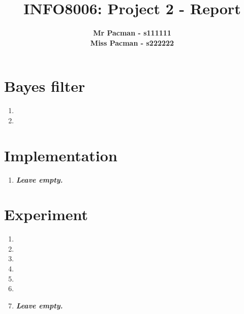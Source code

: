\documentclass{article}
\begin{document}

\title{\Large{INFO8006: Project 2 - Report}}
\vspace{1cm}
\author{\small{\bf Mr Pacman - s111111} \\ \small{\bf Miss Pacman - s222222}}

\maketitle


\section{Bayes filter}

\begin{enumerate}[label=\alph*.,leftmargin=*]
    \item
    \item
\end{enumerate}

\section{Implementation}

\begin{enumerate}[label=\alph*.,leftmargin=*]
    \item \textbf{\textit{Leave empty.}}
\end{enumerate}

\section{Experiment}

\begin{enumerate}[label=\alph*.,leftmargin=*]
    \item
    \item
    \item
    \item
    \item
    \item
    \item \textbf{\textit{Leave empty.}}
\end{enumerate}

\end{document}
